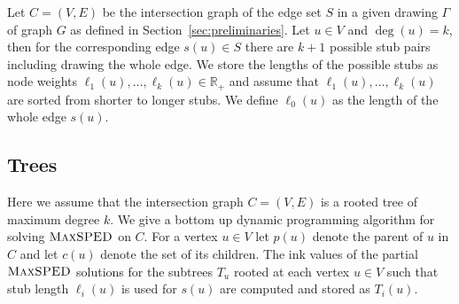 \documentclass[a4paper,english,numberwithinsect]{eurocg18}
\newcommand{\martin}[1]{\todo[inline,color=blue!40]{MN: #1}}
\newcommand{\fabian}[1]{\todo[inline,color=pink!40]{FK: #1}}
\newcommand{\maxsped}{\ensuremath{\textsc{MaxSPED}}\xspace}
\begin{document}
Let $ C = (V,E) $ be the intersection graph of the edge set $S$ in a given drawing $\Gamma$ of graph $ G $ as defined in Section~\ref{sec:preliminaries}. Let $ u \in V $ and $ \deg(u) = k $, then for the corresponding edge $ s(u) \in S $ there are $ k + 1 $ possible stub pairs including drawing the whole edge. We store the lengths of the possible stubs as node weights $ \ell_1(u), \dots, \ell_k(u) \in \mathbb{R}_+$ and assume that $ \ell_1(u),\dots,\ell_k(u) $ are sorted from shorter to longer stubs. We define  $ \ell_0(u) $ as the length of the whole edge $ s(u) $. 

%

\subsection{Trees}
Here we assume that the intersection graph $ C = (V,E) $ is a rooted tree of maximum degree $ k $. We give a bottom up dynamic programming algorithm for solving \maxsped on $ C $. For a vertex $ u \in V $ let $ p(u) $ denote the parent of $ u $ in $ C $ and let $ c(u) $ denote the set of its children. The ink values of the partial \maxsped solutions for the subtrees $T_u$ rooted at each vertex $ u \in V $ such that stub length $ \ell_i(u) $ is used for $s(u)$ are computed and stored as $ T_i(u) $.
\end{document}
